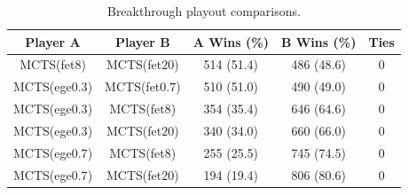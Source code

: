 \documentclass{article}
\begin{document}

\begin{table}[h!]
\begin{center}
\begin{tabular}{|c|c|ccc|}
\hline
Player A & Player B                  & A Wins (\%)  & B Wins (\%)  & Ties \\ 
\hline
MCTS(fet$8$)   & MCTS(fet$20$)       & 514 (51.4)   & 486 (48.6)   & 0    \\
MCTS(ege$0.3$) & MCTS(fet$0.7$)      & 510 (51.0)   & 490 (49.0)   & 0    \\
\hline
MCTS(ege$0.3$) & MCTS(fet$8$)        & 354 (35.4)   & 646 (64.6)   & 0    \\
MCTS(ege$0.3$) & MCTS(fet$20$)       & 340 (34.0)   & 660 (66.0)   & 0    \\
MCTS(ege$0.7$) & MCTS(fet$8$)        & 255 (25.5)   & 745 (74.5)   & 0    \\
MCTS(ege$0.7$) & MCTS(fet$20$)       & 194 (19.4)   & 806 (80.6)   & 0    \\
\hline
\end{tabular}
\end{center}
\caption{Breakthrough playout comparisons.}
\end{table}
\end{document}
